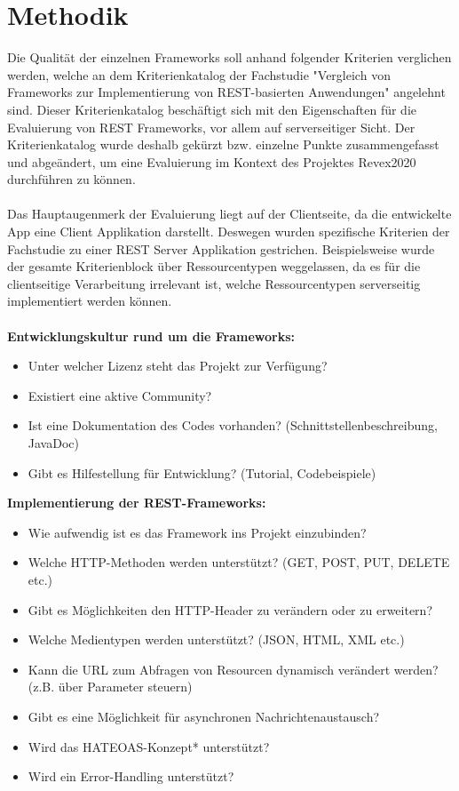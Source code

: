 \section{Methodik}
\label{sec:methodik}
Die Qualität der einzelnen Frameworks soll anhand folgender Kriterien verglichen werden, welche an dem Kriterienkatalog der Fachstudie "Vergleich von Frameworks zur Implementierung von REST-basierten Anwendungen" \cite{vergleich13} angelehnt sind. Dieser Kriterienkatalog beschäftigt sich mit den Eigenschaften für die Evaluierung von REST Frameworks, vor allem auf serverseitiger Sicht. Der Kriterienkatalog wurde deshalb gekürzt bzw. einzelne Punkte zusammengefasst und abgeändert, um eine Evaluierung im Kontext des Projektes Revex2020 durchführen zu können. 
\\\\
Das Hauptaugenmerk der Evaluierung liegt auf der Clientseite, da die entwickelte App eine Client Applikation darstellt. Deswegen wurden spezifische Kriterien der Fachstudie zu einer REST Server Applikation gestrichen. Beispielsweise wurde der gesamte Kriterienblock über Ressourcentypen \cite{ressourcen:rest} weggelassen, da es für die clientseitige Verarbeitung irrelevant ist, welche Ressourcentypen serverseitig implementiert werden können. 
\\\\
\textbf{Entwicklungskultur rund um die Frameworks:}
\begin{itemize}
	\item Unter welcher Lizenz steht das Projekt zur Verfügung?
	\item Existiert eine aktive Community?
	\item Ist eine Dokumentation des Codes vorhanden? (Schnittstellenbeschreibung, JavaDoc)	
	\item Gibt es Hilfestellung für Entwicklung? (Tutorial, Codebeispiele)
\end{itemize}

\textbf{Implementierung der REST-Frameworks:}
\begin{itemize}
	\item Wie aufwendig ist es das Framework ins Projekt einzubinden? 
	\item Welche HTTP-Methoden werden unterstützt? (GET, POST, PUT, DELETE etc.)
	\item Gibt es Möglichkeiten den HTTP-Header zu verändern oder zu erweitern?
	\item Welche Medientypen werden unterstützt? (JSON, HTML, XML etc.)
	\item Kann die URL zum Abfragen von Resourcen dynamisch verändert werden? (z.B. über Parameter steuern)
	\item Gibt es eine Möglichkeit für asynchronen Nachrichtenaustausch?
	\item Wird das HATEOAS-Konzept* unterstützt?
	\item Wird ein Error-Handling unterstützt?	
\end{itemize}

